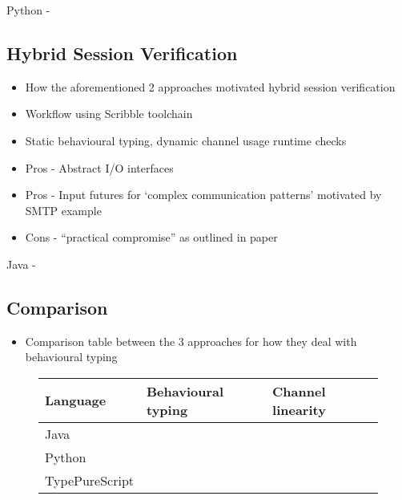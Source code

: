Python - \cite{Python2017}

\subsection{Hybrid Session Verification}
\begin{itemize}
\item How the aforementioned 2 approaches motivated hybrid session verification
\item Workflow using Scribble toolchain 
\item Static behavioural typing, dynamic channel usage runtime checks
\item Pros - Abstract I/O interfaces
\item Pros - Input futures for `complex communication patterns' motivated by SMTP example
\item Cons - ``practical compromise'' as outlined in paper
\end{itemize}

Java - \cite{Hybrid2016}

\subsection{Comparison}
\begin{itemize}
\item Comparison table between the 3 approaches for how they deal with behavioural typing 
\end{itemize}

\begin{figure}[!h]
\centering
\begin{tabular}{l p{} p{}}
Language & Behavioural typing & Channel linearity \\
\hline\hline
Java \cite{Hybrid2016} &  & \\
\hline
Python \cite{Python2017} &  & \\
\hline
TypePureScript \cite{PureScript2019} &  & \\
\end{tabular}
\label{table:comparison}
\end{figure}

